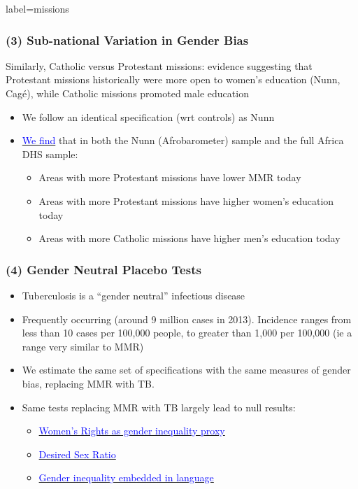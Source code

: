 \documentclass[10pt,letterpaper,subeqn]{beamer}
\begin{document}
\begin{frame}{label=missions}
\frametitle{(3) Sub-national Variation in Gender Bias}
Similarly, Catholic versus Protestant missions: evidence suggesting that 
Protestant missions historically were more open to women's education (Nunn, 
Cagé), while Catholic missions promoted male education
\vspace{2mm}
\begin{itemize}
\item We follow an identical specification (wrt controls) as Nunn
\item \hyperlink{MissionsTab}{\textcolor{blue}{We find}} that in both the 
      Nunn (Afrobarometer) sample and the full Africa DHS sample:
\begin{itemize}
\item Areas with more Protestant missions have lower MMR today
\item Areas with more Protestant missions have higher women's education today
\item Areas with more Catholic missions have higher men's education today
\end{itemize}
\end{itemize}
\end{frame}


\begin{frame}

\end{frame}





\begin{frame}[label=placebos]
\frametitle{(4) Gender Neutral Placebo Tests}
\begin{itemize}
\setlength{\itemsep}{10pt}
  \item Tuberculosis is a ``gender neutral'' infectious disease
  \item Frequently occurring (around 9 million cases in 2013). Incidence ranges
        from less than 10 cases per 100,000 people, to greater than 1,000 per
        100,000 (ie a range very similar to MMR)
  \item We estimate the same set of specifications with the same measures of
        gender bias, replacing MMR with TB.
  \item Same tests replacing MMR with TB largely lead to null results:
  \begin{itemize}
    \item \hyperlink{placebo1}{\textcolor{blue}{Women's Rights as gender
                                                inequality proxy}}
    \item \hyperlink{placebo2}{\textcolor{blue}{Desired Sex Ratio}}
    \item \hyperlink{placebo3}{\textcolor{blue}{Gender inequality embedded in
                                                language}}
  \end{itemize}
\end{itemize}
\end{frame}
\end{document}
